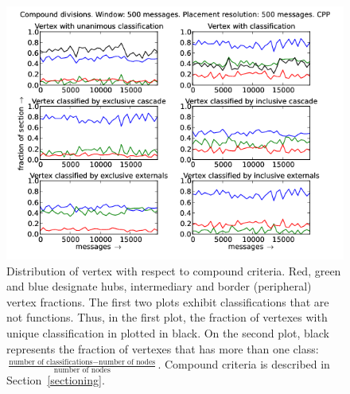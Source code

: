 \documentclass[%
 aip,
 jmp,%
 amsmath,amssymb,
 reprint,%
]{revtex4-1}
\begin{document}
\begin{figure}[hbtp] 
   \centering
        \includegraphics[width=\textwidth]{figs/CPP/500_2}
    \caption{Distribution of vertex with respect to compound criteria. Red, green and blue designate hubs, intermediary and border (peripheral) vertex fractions. The first two plots exhibit classifications that are not functions. Thus, in the first plot, the fraction of vertexes with unique classification in plotted in black. On the second plot, black represents the fraction of vertexes that has more than one class: $\frac{\text{number of classifications} - \text{number of nodes}}{\text{number of nodes}}$. Compound criteria is described in Section~\ref{sectioning}.}
    \label{fig:cpp500_}
\end{figure}
\end{document}
